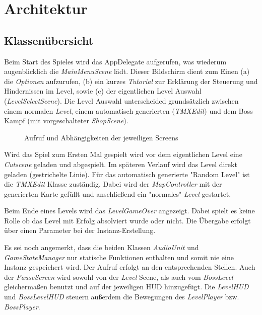 \chapter{Architektur}

\section{Klassenübersicht}\label{sec:Klassenuebersicht}

Beim Start des Spieles wird das AppDelegate aufgerufen, was wiederum augenblicklich die \textit{MainMenuScene} lädt. Dieser Bildschirm dient zum Einen (a) die \textit{Optionen} aufzurufen, (b) ein kurzes \textit{Tutorial} zur Erklärung der Steuerung und Hindernissen im Level, sowie (c) der eigentlichen Level Auswahl (\textit{LevelSelectScene}).
Die Level Auswahl unterscheided grundsätzlich zwischen einem normalen \textit{Level}, einem automatisch generierten (\textit{TMXEdit}) und dem Boss Kampf (mit vorgeschalteter \textit{ShopScene}).

\begin{figure}[h]
\scalebox{0.7}{}
\caption{Aufruf und Abhängigkeiten der jeweiligen Screens}
\label{calltree}
\end{figure}


Wird das Spiel zum Ersten Mal gespielt wird vor dem eigentlichen Level eine \textit{Cutscene} geladen und abgespielt. Im späteren Verlauf wird das Level direkt geladen (gestrichelte Linie).
Für das automatisch generierte "Random Level" ist die \textit{TMXEdit} Klasse zuständig. Dabei wird der \textit{MapController} mit der generierten Karte gefüllt und anschließend ein "normales" \textit{Level} gestartet.

Beim Ende eines Levels wird das \textit{LevelGameOver} angezeigt. Dabei spielt es keine Rolle ob das Level mit Erfolg absolviert wurde oder nicht. Die Übergabe erfolgt über einen Parameter bei der Instanz-Erstellung.

Es sei noch angemerkt, dass die beiden Klassen \textit{AudioUnit} und \textit{GameStateManager} nur statische Funktionen enthalten und somit nie eine Instanz gespeichert wird. Der Aufruf erfolgt an den entsprechenden Stellen.
Auch der \textit{PauseScreen} wird sowohl von der \textit{Level} Scene, als auch vom \textit{BossLevel} gleichermaßen benutzt und auf der jeweiligen HUD hinzugefügt. Die \textit{LevelHUD} und \textit{BossLevelHUD} steuern außerdem die Bewegungen des \textit{LevelPlayer} bzw. \textit{BossPlayer}.



